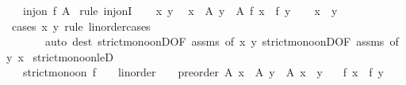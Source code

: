 \begin{isabellebody}
\ \ \ {\isachardoublequoteopen}inj{\isacharunderscore}{\kern0pt}on\ f\ A{\isachardoublequoteclose}\isanewline
%
\isadelimproof
%
\endisadelimproof
%
\isatagproof
{}\isamarkupfalse%
\ {\isacharparenleft}{\kern0pt}rule\ inj{\isacharunderscore}{\kern0pt}onI{\isacharparenright}{\kern0pt}\isanewline
\ \ \isamarkupfalse%
\ x\ y\ \isamarkupfalse%
\ {\isachardoublequoteopen}x\ {\isasymin}\ A{\isachardoublequoteclose}\ {\isachardoublequoteopen}y\ {\isasymin}\ A{\isachardoublequoteclose}\ {\isachardoublequoteopen}f\ x\ {\isacharequal}{\kern0pt}\ f\ y{\isachardoublequoteclose}\isanewline
\ \ \isamarkupfalse%
\ {\isachardoublequoteopen}x\ {\isacharequal}{\kern0pt}\ y{\isachardoublequoteclose}\isanewline
\ \ \ \ \isamarkupfalse%
\ {\isacharparenleft}{\kern0pt}cases\ x\ y\ rule{\isacharcolon}{\kern0pt}\ linorder{\isacharunderscore}{\kern0pt}cases{\isacharparenright}{\kern0pt}\isanewline
\ \ \ \ \ \ \ {\isacharparenleft}{\kern0pt}auto\ dest{\isacharcolon}{\kern0pt}\ strict{\isacharunderscore}{\kern0pt}mono{\isacharunderscore}{\kern0pt}onD{\isacharbrackleft}{\kern0pt}OF\ assms{\isacharcomma}{\kern0pt}\ of\ x\ y{\isacharbrackright}{\kern0pt}\ strict{\isacharunderscore}{\kern0pt}mono{\isacharunderscore}{\kern0pt}onD{\isacharbrackleft}{\kern0pt}OF\ assms{\isacharcomma}{\kern0pt}\ of\ y\ x{\isacharbrackright}{\kern0pt}{\isacharparenright}{\kern0pt}\isanewline
{}\isamarkupfalse%
%
\endisatagproof
{\isafoldproof}%
%
\isadelimproof
\isanewline
%
\endisadelimproof
\isanewline
{}\isamarkupfalse%
\ strict{\isacharunderscore}{\kern0pt}mono{\isacharunderscore}{\kern0pt}on{\isacharunderscore}{\kern0pt}leD{\isacharcolon}{\kern0pt}\isanewline
\ \ \ {\isachardoublequoteopen}strict{\isacharunderscore}{\kern0pt}mono{\isacharunderscore}{\kern0pt}on\ {\isacharparenleft}{\kern0pt}f\ {\isacharcolon}{\kern0pt}{\isacharcolon}{\kern0pt}\ {\isacharparenleft}{\kern0pt}{\isacharunderscore}{\kern0pt}\ {\isacharcolon}{\kern0pt}{\isacharcolon}{\kern0pt}\ linorder{\isacharparenright}{\kern0pt}\ {\isasymRightarrow}\ {\isacharunderscore}{\kern0pt}\ {\isacharcolon}{\kern0pt}{\isacharcolon}{\kern0pt}\ preorder{\isacharparenright}{\kern0pt}\ A{\isachardoublequoteclose}\ {\isachardoublequoteopen}x\ {\isasymin}\ A{\isachardoublequoteclose}\ {\isachardoublequoteopen}y\ {\isasymin}\ A{\isachardoublequoteclose}\ {\isachardoublequoteopen}x\ {\isasymle}\ y{\isachardoublequoteclose}\isanewline
\ \ \ {\isachardoublequoteopen}f\ x\ {\isasymle}\ f\ y{\isachardoublequoteclose}\isanewline

\end{isabellebody}
